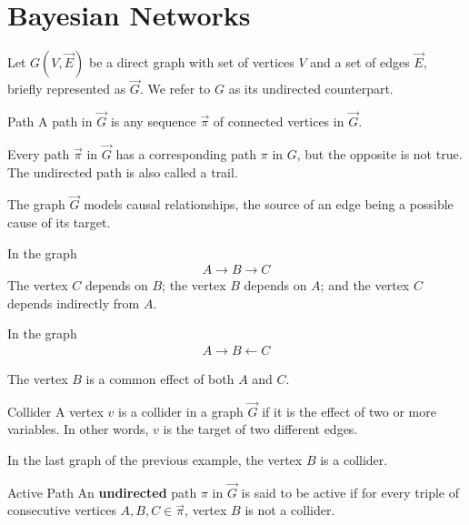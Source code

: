\chapter{Bayesian Networks}\label{chapter:appendix-bayesian-network}

Let $G(V,\vec{E})$ be a direct graph with set of vertices $V$ and a set of edges $\vec{E}$, briefly represented as $\vec{G}$. We refer to $G$ as its undirected counterpart.

\begin{definition}{Path}
A path in $\vec{G}$ is any sequence $\vec{\pi}$ of connected vertices in $\vec{G}$.
\end{definition}

\begin{example}
Every path $\vec{\pi}$ in $\vec{G}$ has a corresponding path $\pi$ in $G$, but the opposite is not true. The undirected path is also called a trail.
\end{example}

The graph $\vec{G}$ models causal relationships, the source of an edge being a possible cause of its target.

\begin{example}
In the graph 
\begin{align*}
A\rightarrow B \rightarrow C
\end{align*}
The vertex $C$ depends on $B$; the vertex $B$ depends on $A$; and the vertex $C$ depends indirectly from $A$.

In the graph
\begin{align*}
A\rightarrow B \leftarrow C
\end{align*}

The vertex $B$ is a common effect of both $A$ and $C$.

\end{example}

\begin{definition}{Collider}
A vertex $v$ is a collider in a graph $\vec{G}$ if it is the effect of two or more variables. In other words, $v$ is the target of two different edges.
\end{definition}

\begin{example}
In the last graph of the previous example, the vertex $B$ is a collider.
\end{example}

\begin{definition}{Active Path}
An \textbf{undirected} path $\pi$ in $\vec{G}$ is said to be active if for every triple of consecutive vertices $A,B,C \in \vec{\pi}$, vertex $B$ is not a collider.
\end{definition}

